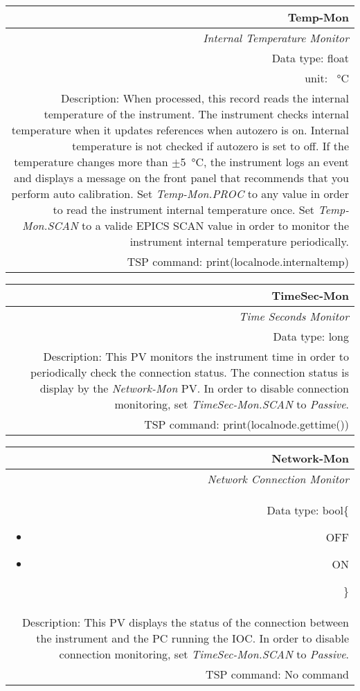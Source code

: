 \documentclass[openany]{article}
\begin{document}
		\begin{tabular}{N}
			\hline
			\bfseries Temp-Mon\label{pv:temp-mon} \\ \hline
			\emph{Internal Temperature Monitor} \\
			Data type: float \\
			unit: \SI{}{\degreeCelsius} \\
			Description: When processed, this record reads the internal temperature of the instrument. The instrument checks internal temperature when it updates references when autozero is on. Internal temperature is not checked if autozero is set to off. If the temperature changes more than $\pm$\SI{5}{\degreeCelsius}, the instrument logs an event and displays a message on the front panel that recommends that you perform auto calibration. Set \emph{Temp-Mon.PROC} to any value in order to read the instrument internal temperature once. Set \emph{Temp-Mon.SCAN} to a valide EPICS SCAN value in order to monitor the instrument internal temperature periodically. \\
			TSP command: print(localnode.internaltemp)
		\end{tabular}

		\begin{tabular}{N}
			\hline
			\bfseries TimeSec-Mon\label{pv:timesec-mon} \\ \hline
			\emph{Time Seconds Monitor} \\
			Data type: long \\
			Description: This PV monitors the instrument time in order to periodically check the connection status. The connection status is display by the \emph{Network-Mon} PV. In order to disable connection monitoring, set \emph{TimeSec-Mon.SCAN} to \emph{Passive}. \\
			TSP command: print(localnode.gettime())
		\end{tabular}

		\begin{tabular}{N}
			\hline
			\bfseries Network-Mon\label{pv:network-mon} \\ \hline
			\emph{Network Connection Monitor} \\
			Data type: bool\{\begin{itemize}[noitemsep]
				\small
				\item[] OFF
				\item[] ON
			\end{itemize}\} \\
			Description: This PV displays the status of the connection between the instrument and the PC running the IOC. In order to disable connection monitoring, set \emph{TimeSec-Mon.SCAN} to \emph{Passive}. \\
			TSP command: No command
		\end{tabular}
\end{document}
